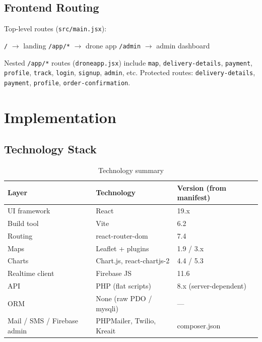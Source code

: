 \documentclass[12pt,a4paper,oneside]{report}
\begin{document}
\section{Frontend Routing}
Top-level routes (\texttt{src/main.jsx}):
\begin{center}
    \texttt{/} $\rightarrow$ landing \quad
    \texttt{/app/*} $\rightarrow$ drone app \quad
    \texttt{/admin} $\rightarrow$ admin dashboard
\end{center}

Nested \texttt{/app/*} routes (\texttt{droneapp.jsx}) include
\texttt{map}, \texttt{delivery-details}, \texttt{payment}, \texttt{profile}, \texttt{track},
\texttt{login}, \texttt{signup}, \texttt{admin}, etc. Protected routes:
\texttt{delivery-details}, \texttt{payment}, \texttt{profile}, \texttt{order-confirmation}.

\chapter{Implementation}

\section{Technology Stack}
\begin{table}[H]
    \centering
    \caption{Technology summary}
    \label{tab:stack}
    \begin{tabular}{@{}lll@{}}
        \toprule
        \textbf{Layer} & \textbf{Technology} & \textbf{Version (from manifest)} \\
        \midrule
        UI framework & React & 19.x \\
        Build tool & Vite & 6.2 \\
        Routing & react-router-dom & 7.4 \\
        Maps & Leaflet + plugins & 1.9 / 3.x \\
        Charts & Chart.js, react-chartjs-2 & 4.4 / 5.3 \\
        Realtime client & Firebase JS & 11.6 \\
        API & PHP (flat scripts) & 8.x (server-dependent) \\
        ORM & None (raw PDO / mysqli) & --- \\
        Mail / SMS / Firebase admin & PHPMailer, Twilio, Kreait & composer.json \\
        \bottomrule
    \end{tabular}
\end{table}
\end{document}

